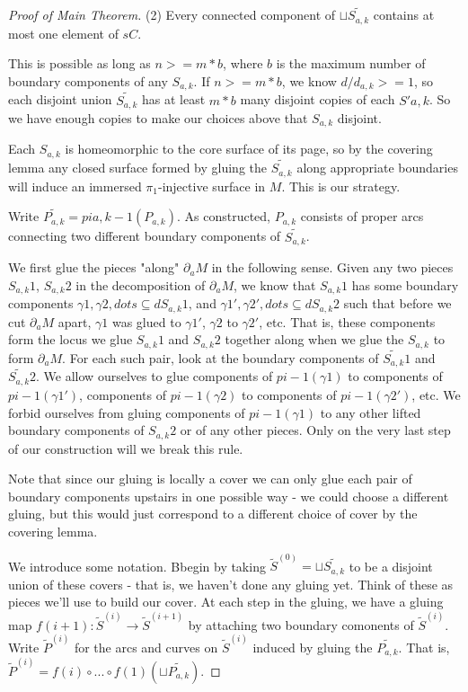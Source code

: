 \documentclass[12pt]{amsart}
\theoremstyle{definition}
\theoremstyle{remark}
\newcommand{\bd}{\partial}
\newcommand{\cin}{\subseteq}
\begin{document}
\begin{proof}[Proof of Main Theorem]
(2) Every connected component of $\sqcup \widetilde{S_{a,k}}$ contains at most one element
of $sC$.

This is possible as long as $n >= m*b$, where $b$ is the maximum number of
boundary components of any $S_{a,k}$. If $n>= m*b$, we know $d/d_{a,k} >= 1$, so each
disjoint union $\widetilde{S_{a,k}}$ has at least $m*b$ many disjoint copies of each
$S'a,k$.  So we have enough copies to make our choices above that $S_{a,k}$
disjoint.

Each $S_{a,k}$ is homeomorphic to the core surface of its page, so by the covering
lemma any closed surface formed by gluing the $\widetilde{S_{a,k}}$ along appropriate
boundaries will induce an immersed $\pi_1$-injective surface in $M$. This is
our strategy.

Write $\widetilde{P_{a,k}}=pia,k-1(P_{a,k})$. As constructed, $P_{a,k}$ consists of proper arcs
connecting two different boundary components of $\widetilde{S_{a,k}}$.

We first glue the pieces "along" $\bd_aM$ in the following sense. Given any two
pieces $S_{a,k}1$, $S_{a,k}2$ in the decomposition of $\bd_aM$, we know that $S_{a,k}1$ has
some boundary components $\gamma1,\gamma2,dots \cin dS_{a,k}1$, and
$\gamma1',\gamma2',dots \cin dS_{a,k}2$ such that before we cut $\bd_aM$ apart, $\gamma1$
was glued to $\gamma1'$, $\gamma2$ to $\gamma2'$, etc.  That is, these components
form the locus we glue $S_{a,k}1$ and $S_{a,k}2$ together along when we glue the
$S_{a,k}$ to form $\bd_aM$.  For each such pair, look at the boundary components of
$\widetilde{S_{a,k}}1$ and $\widetilde{S_{a,k}}2$.  We allow ourselves to glue components of
$pi-1(\gamma1)$ to components of $pi-1(\gamma1')$, components of $pi-1(\gamma2)$
to components of $pi-1(\gamma2')$, etc. We forbid ourselves from gluing
components of $pi-1(\gamma1)$ to any other lifted boundary components of $S_{a,k}2$
or of any other pieces. Only on the very last step of our construction will we
break this rule.

Note that since our gluing is locally a cover we can only glue each pair of
boundary components upstairs in one possible way - we could choose a different
gluing, but this would just correspond to a different choice of cover by the
covering lemma.

We introduce some notation. Bbegin by taking $\widetilde{S}^{(0)} = \sqcup \widetilde{S_{a,k}}$ to
be a disjoint union of these covers - that is, we haven't done any gluing yet.
Think of these as pieces we'll use to build our cover. At each step in the
gluing, we have a gluing map $f(i+1) \colon \widetilde{S}^{(i)} \to
\widetilde{S}^{(i+1)}$ by attaching two boundary comonents of
$\widetilde{S}^{(i)}$. Write $\widetilde{P}^{(i)}$ for the arcs and curves on
$\widetilde{S}^{(i)}$ induced by gluing the $\widetilde{P_{a,k}}$.  That is,
$\widetilde{P}^{(i)} = f(i) \circ ...  \circ f(1) (\sqcup
\widetilde{P_{a,k}})$.


\end{proof}
\end{document}
